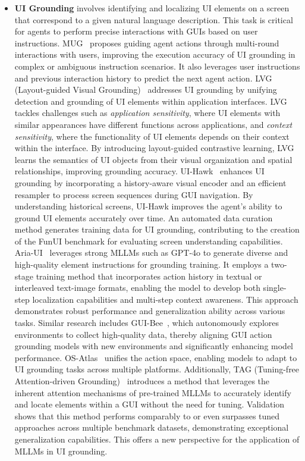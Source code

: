 \begin{itemize} 
\item \textbf{UI Grounding}
involves identifying and localizing UI elements on a screen that correspond to a given natural language description. This task is critical for agents to perform precise interactions with GUIs based on user instructions.
MUG~\cite{li2022mug} proposes guiding agent actions through multi-round interactions with users, improving the execution accuracy of UI grounding in complex or ambiguous instruction scenarios. It also leverages user instructions and previous interaction history to predict the next agent action.
LVG (Layout-guided Visual Grounding)~\cite{qian2024visualgrounding} addresses UI grounding by unifying detection and grounding of UI elements within application interfaces. LVG tackles challenges such as \textit{application sensitivity}, where UI elements with similar appearances have different functions across applications, and \textit{context sensitivity}, where the functionality of UI elements depends on their context within the interface. By introducing layout-guided contrastive learning, LVG learns the semantics of UI objects from their visual organization and spatial relationships, improving grounding accuracy.
UI-Hawk~\cite{zhang2024ui-hawk} enhances UI grounding by incorporating a history-aware visual encoder and an efficient resampler to process screen sequences during GUI navigation. By understanding historical screens, UI-Hawk improves the agent's ability to ground UI elements accurately over time. An automated data curation method generates training data for UI grounding, contributing to the creation of the FunUI benchmark for evaluating screen understanding capabilities.
Aria-UI~\cite{yang2024aria} leverages strong MLLMs such as GPT-4o to generate diverse and high-quality element instructions for grounding training. It employs a two-stage training method that incorporates action history in textual or interleaved text-image formats, enabling the model to develop both single-step localization capabilities and multi-step context awareness. This approach demonstrates robust performance and generalization ability across various tasks. Similar research includes GUI-Bee~\cite{fan2025gui}, which autonomously explores environments to collect high-quality data, thereby aligning GUI action grounding models with new environments and significantly enhancing model performance. OS-Atlas~\cite{wu2024atlas} unifies the action space, enabling models to adapt to UI grounding tasks across multiple platforms. Additionally, TAG (Tuning-free Attention-driven Grounding)~\cite{xu2024attention} introduces a method that leverages the inherent attention mechanisms of pre-trained MLLMs to accurately identify and locate elements within a GUI without the need for tuning. Validation shows that this method performs comparably to or even surpasses tuned approaches across multiple benchmark datasets, demonstrating exceptional generalization capabilities. This offers a new perspective for the application of MLLMs in UI grounding.



\end{itemize}
